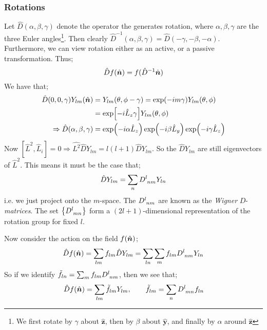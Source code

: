 \subsubsection{Rotations}
Let $\hat{D}(\alpha, \beta, \gamma)$ denote the operator the generates rotation, where $\alpha, \beta, \gamma$ are the three Euler angles\footnote{We first rotate by $\gamma$ about $\hat{\bm{z}}$, then by $\beta$ about $\hat{\bm{y}}$, and finally by $\alpha$ around $\hat{\bm{z}}$}. Then clearly $\hat{D}^{-1}(\alpha, \beta, \gamma) = \hat{D}(-\gamma, -\beta, -\alpha)$. Furthermore, we can view rotation either as an active, or a passive transformation. Thus;
\begin{equation}
\hat{D}f(\hat{\bm{n}}) = f(\hat{D}^{-1}\hat{\bm{n}})
\end{equation}
We have that;
\begin{align*}
\hat{D}(0, 0, \gamma)Y_{lm}(\nhat) &= Y_{lm}(\theta, \phi - \gamma) = \exp(-im\gamma)Y_{lm}(\theta, \phi) \\
&= \exp\left[-i\hat{L}_z \gamma\right]Y_{lm}(\theta, \phi) \\
\Rightarrow \hat{D}(\alpha, \beta, \gamma) &= \exp\left(-i\alpha \hat{L}_z\right) \exp\left(- i\beta \hat{L}_y\right) \exp\left(- i \gamma\hat{L}_{z}\right)
\end{align*}
Now $\left[\hat{L}^2, \hat{L}_i\right] = 0 \Rightarrow \hat{L^2}\hat{D}Y_{lm} = l(l + 1)\hat{D}Y_{lm}$. So the $\hat{D}Y_{lm}$ are still eigenvectors of $\hat{L}^2$. This means it must be the case that;
\begin{equation}
\hat{D}Y_{lm} = \sum_{n}{D\indices{^{l}_{nm}}}Y_{ln}
\end{equation}
i.e. we just project onto the $m$-space. The $D\indices{^{l}_{nm}}$ are known as the \emph{Wigner} $D$-\emph{matrices}. The set $\set{D\indices{^{l}_{mn}}}$ form a $(2l + 1)$-dimensional representation of the rotation group for fixed $l$. 
\begin{examplebox} 
Now consider the action on the field $f(\hat{\bm{n}})$;
\begin{equation*}
\hat{D}f(\nhat) = \sum_{lm}{f_{lm}\hat{D}Y_{lm}} = \sum_{ln}{\sum_{m}{f_{lm} D\indices{^{l}_{nm}}Y_{ln}}}
\end{equation*}
So if we identify $\tilde{f}_{ln} = \sum_{m}{f_{lm}D\indices{^{l}_{nm}}}$, then we see that;
\begin{equation}
\hat{D}f(\nhat) = \sum_{lm}{\tilde{f}_{lm}Y_{lm}}, \qquad \tilde{f}_{lm} = \sum_{n}{D\indices{^{l}_{mn}}f_{ln}}
\end{equation}
\end{examplebox}
